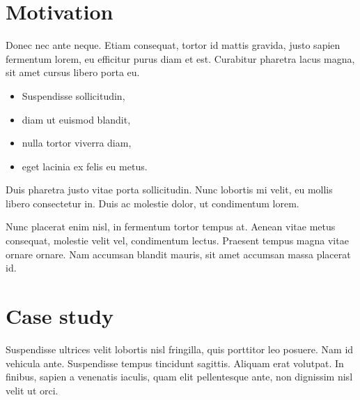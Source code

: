 \documentclass[generic]{tudposter} %
\begin{document}
\begin{multicols}{2}
\section{Motivation}	
Donec nec ante neque. Etiam consequat, tortor id mattis gravida, justo sapien fermentum lorem, eu efficitur purus diam et est. Curabitur pharetra lacus magna, sit amet cursus libero porta eu. 
\begin{itemize}[noitemsep,leftmargin=3cm,labelsep=7mm,label=\textcolor{tudblue}{$\bullet$}]
	\item Suspendisse sollicitudin,
	\item diam ut euismod blandit,
	\item nulla tortor viverra diam,
	\item eget lacinia ex felis eu metus.
\end{itemize} 
Duis pharetra justo vitae porta sollicitudin. Nunc lobortis mi velit, eu mollis libero consectetur in. Duis ac molestie dolor, ut condimentum lorem.

Nunc placerat enim nisl, in fermentum tortor tempus at. Aenean vitae metus consequat, molestie velit vel, condimentum lectus. Praesent tempus magna vitae ornare ornare. Nam accumsan blandit mauris, sit amet accumsan massa placerat id.

\section{Case study}
Suspendisse ultrices velit lobortis nisl fringilla, quis porttitor leo posuere. Nam id vehicula ante. Suspendisse tempus tincidunt sagittis. Aliquam erat volutpat. In finibus, sapien a venenatis iaculis, quam elit pellentesque ante, non dignissim nisl velit ut orci.


\end{multicols}
\end{document}
